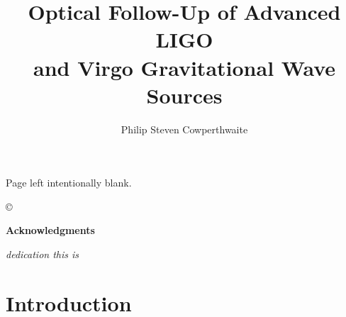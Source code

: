 \documentclass[bound]{hvdthesis}
\author{Philip Steven Cowperthwaite}
\title{Optical Follow-Up of Advanced LIGO \\
and Virgo Gravitational Wave Sources}
\begin{document}
% 

\clearpage
\thispagestyle{empty}
\begin{center}
\vspace*{\fill}
Page left intentionally blank.
\vspace*{\fill}
\end{center}

\frontmatter

\makecover
\copyright

%
{\singlespace
\tableofcontents
}
\newpage
\clearpage


\newpage
%
\thispagestyle{plain}

\vskip 0.5cm
{\centerline {\Large \bf Acknowledgments}}
\vskip 0.5cm
\normalsize




\clearpage
%
\thispagestyle{plain}

\vspace*{\fill}
{\centerline {\em dedication this is}}
\vspace*{\fill}


\mainmatter
\pagestyle{fancy}


%
%

\chapter[Introduction]{Introduction}\label{c:intro}

\clearpage
%
\end{document}

